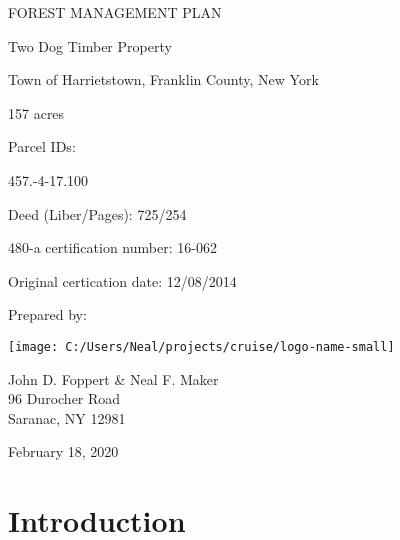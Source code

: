 \documentclass[]{tufte-handout}
\date{}
\begin{document}
 \vspace*{30pt}

\huge FOREST MANAGEMENT PLAN

\vspace{30pt}

\LARGE Two Dog Timber Property

\vspace{22pt}

\normalsize Town of Harrietstown, Franklin County, New York

\vspace{70pt}

\small 157 acres

\vspace{18pt}

Parcel IDs:

\vspace{8pt}

457.-4-17.100

\vspace{10pt}

Deed (Liber/Pages): 725/254

\vspace{10pt}

480-a certification number: 16-062

\vspace{10pt}

Original certication date: 12/08/2014

\vspace{60pt}

Prepared by:

\texttt{[image: C:/Users/Neal/projects/cruise/logo-name-small]}

John D. Foppert \& Neal F. Maker\\
96 Durocher Road\\
Saranac, NY 12981

\vspace{30pt}

\large February 18, 2020

\pagebreak
{}

\section{Introduction}\label{introduction}
\end{document}
